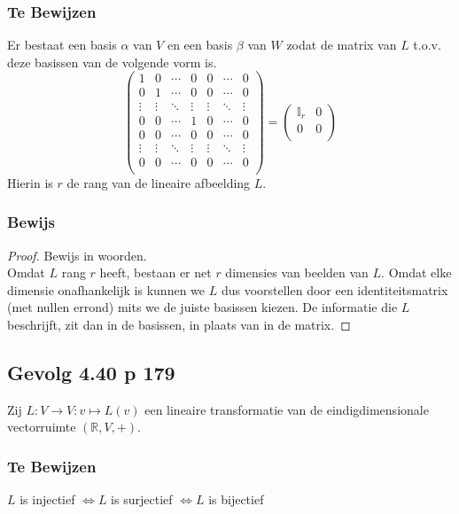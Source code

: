 \documentclass[lineaire_algebra_oplossingen.tex]{subfiles}
\begin{document}
\subsubsection*{Te Bewijzen}
Er bestaat een basis $\alpha$ van $V$ en een basis $\beta$ van $W$ zodat de matrix van $L$ t.o.v. deze basissen van de volgende vorm is.
\[
\begin{pmatrix}
1 & 0 & \cdots & 0 & 0 & \cdots & 0\\
0 & 1 & \cdots & 0 & 0 & \cdots & 0\\
\vdots & \vdots & \ddots & \vdots & \vdots & \ddots & \vdots\\
0 & 0 & \cdots & 1 & 0 & \cdots & 0\\
0 & 0 & \cdots & 0 & 0 & \cdots & 0\\
\vdots & \vdots & \ddots & \vdots & \vdots & \ddots & \vdots\\
0 & 0 & \cdots & 0 & 0 & \cdots & 0\\
\end{pmatrix}
=
\begin{pmatrix}
\mathbb{I}_r & 0\\
0 & 0\\
\end{pmatrix}
\]
Hierin is $r$ de rang van de lineaire afbeelding $L$.

\subsubsection*{Bewijs}
\begin{proof}
Bewijs in woorden.\\
Omdat $L$ rang $r$ heeft, bestaan er net $r$ dimensies van beelden van $L$. Omdat elke dimensie onafhankelijk is kunnen we $L$ dus voorstellen door een identiteitsmatrix (met nullen errond) mits we de juiste basissen kiezen. De informatie die $L$ beschrijft, zit dan in de basissen, in plaats van in de matrix.
\end{proof}


\subsection{Gevolg 4.40 p 179}
\label{4.40}
Zij $L: V\rightarrow V : v\mapsto L(v)$ een lineaire transformatie van de eindigdimensionale vectorruimte $(\mathbb{R},V,+)$.

\subsubsection*{Te Bewijzen}
\begin{center}
$L$ is injectief $\Leftrightarrow L$ is surjectief $\Leftrightarrow L$ is bijectief
\end{center}
\end{document}
